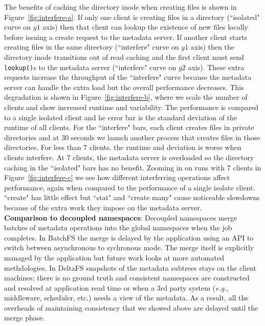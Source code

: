 The benefits of caching the directory inode when creating files is shown in
Figure~\ref{fig:interfere-a}.  If only one client is creating files in a
directory (``isolated" curve on \(y1\) axis) then that client can lookup the
existence of new files locally before issuing a create request to the metadata
server. If another client starts creating files in the same directory
(``interfere" curve on \(y1\) axis) then the directory inode transitions out of
read caching and the first client must send \texttt{lookup()}s to the metadata
server (``interfere" curve on \(y2\) axis). These extra requests increase the
throughput of the ``interfere" curve because the metadata server can handle the
extra load but the overall performance decreases.  This degradation is shown in
Figure~\ref{fig:interfere-b}, where we scale the number of clients and show
increased runtime and variability. The performance is compared to a single
isolated client and he error bar is the standard deviation of the runtime of
all clients.  For the ``interfere" bars, each client creates files in private
directories and at 30 seconds we launch another process that creates files in
those directories.  For less than 7 clients, the runtime and deviation is worse
when clients interfere. At 7 clients, the metadata server is overloaded so the
directory caching in the ``isolated" bars has no benefit. Zooming in on runs
with 7 clients in Figure~\ref{fig:interfere-c} we see how different
interferring operations affect performance, again when compared to the
performance of a single isolate client.  ``create" has little effect but
``stat" and ``create many" cause noticeable slowdowns because of the extra work
they impose on the metadata server.\\


\noindent\textbf{Comparison to decoupled namespaces}: Decoupled namespaces
merge batches of metadata operations into the global namespaces when the job
completes.  In BatchFS the merge is delayed by the application using an API to
switch between asynchronous to sychronous mode. The merge itself is explicitly
managed by the application but future work looks at more automated
methdologies. In DeltaFS snapshots of the metadata subtrees stays on the client
machines; there is no ground truth and consistent namespaces are constructed
and resolved at application read time or when a 3rd party system ({\it e.g.},
middleware, scheduler, etc.) needs a view of the metadata. As a result, all the
overheads of maintaining consistency that we showed above are delayed until the
merge phase.

